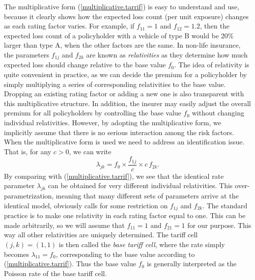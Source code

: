 \documentclass[12pt]{article}
\begin{document}
The multiplicative form (\ref{multiplicative.tarrif}) is easy to understand and use, because it clearly shows how the expected loss count (per unit exposure) changes as each rating factor varies. For example, if $f_{11}=1$ and $f_{12}=1.2$, then the expected loss count of a policyholder with a vehicle of type B would be 20\% larger than type A, when the other factors are the same. In non-life insurance, the parameters $f_{1j}$ and $f_{2k}$  are known as \textit{relativities} as they determine how much expected loss should change relative to the base value $f_0$. The idea of relativity is quite convenient in practice, as we can decide the premium for a policyholder by simply multiplying a series of corresponding relativities to the base value. %
Dropping an existing rating factor or adding a new one is also transparent with this multiplicative structure. In addition, the insurer may easily adjust the overall premium for all policyholders by controlling the base value $f_0$ without changing individual relativities. However, by adopting the multiplicative form, we implicitly assume that there is no serious interaction among the risk factors.\\

When the multiplicative form is used we need to address an identification issue. That is, for any $c>0$, we can write 
\begin{equation}
\label{multi.tariff.2}\nonumber
\lambda_{jk}= f_0 \times \frac{f_{1j}}{c} \times c\,f_{2k}. 
\end{equation} By comparing with (\ref{multiplicative.tarrif}), we see that the identical rate parameter $\lambda_{jk}$ can be obtained for very different individual relativities. This over-parametrization, meaning that many different sets of parameters arrive at the identical model, obviously calls for some restriction on $f_{1j}$ and $f_{2k}$. The standard practice is to make one relativity in each rating factor equal to one. This can be made arbitrarily, so we will assume that $f_{11}=1$ and $f_{21}=1$ for our purpose.  This way all other relativities are uniquely determined. The tariff cell $(j,k)=(1,1)$ is then called the\textit{ base tariff cell}, where the rate simply becomes $\lambda_{11}=f_0$, corresponding to the base value according to (\ref{multiplicative.tarrif}). Thus the base value $f_0$ is generally interpreted as the Poisson rate of the base tariff cell. \\
\end{document}

